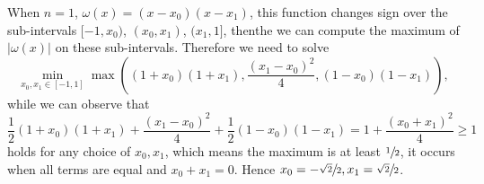 \begin{example}
    When $n = 1$, $\omega(x) = (x - x_0)(x - x_1)$, this function changes sign over the sub-intervals $[-1, x_0)$, $(x_0, x_1)$, $(x_1, 1]$, thenthe  we can compute the maximum of $|\omega(x)|$ on these sub-intervals. Therefore we need to solve 
    \begin{equation}
        \min_{x_0, x_1\in [-1,1]}\max((1 + x_0)(1 + x_1), \frac{(x_1-x_0)^2}{4}, (1 - x_0)(1 - x_1) ),
    \end{equation}
    while we can observe that 
    \begin{equation}
       \frac{1}{2} (1 + x_0)(1 + x_1) +  \frac{(x_1-x_0)^2}{4} + \frac{1}{2}(1 - x_0)(1 - x_1) = 1 + \frac{(x_0 + x_1)^2}{4}\ge 1
    \end{equation}
    holds for any choice of $x_0, x_1$, which means the maximum is at least $\sfrac{1}{2}$, it occurs when all terms are equal and $x_0 + x_1 = 0$. Hence $x_0 = -\sfrac{\sqrt{2}}{2}, x_1 = \sfrac{\sqrt{2}}{2}$.
\end{example}

